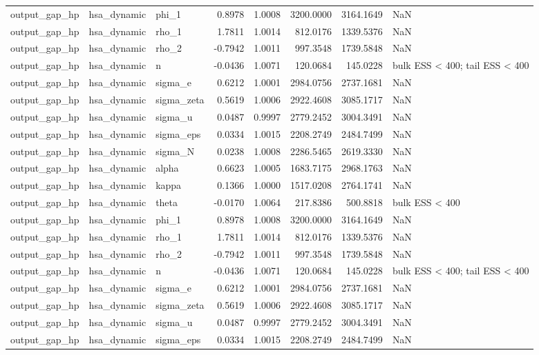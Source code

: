 \begin{tabular}{lllrrrrl}
output\_gap\_hp & hsa\_dynamic & phi\_1 & 0.8978 & 1.0008 & 3200.0000 & 3164.1649 & NaN \\
output\_gap\_hp & hsa\_dynamic & rho\_1 & 1.7811 & 1.0014 & 812.0176 & 1339.5376 & NaN \\
output\_gap\_hp & hsa\_dynamic & rho\_2 & -0.7942 & 1.0011 & 997.3548 & 1739.5848 & NaN \\
output\_gap\_hp & hsa\_dynamic & n & -0.0436 & 1.0071 & 120.0684 & 145.0228 & bulk ESS < 400; tail ESS < 400 \\
output\_gap\_hp & hsa\_dynamic & sigma\_e & 0.6212 & 1.0001 & 2984.0756 & 2737.1681 & NaN \\
output\_gap\_hp & hsa\_dynamic & sigma\_zeta & 0.5619 & 1.0006 & 2922.4608 & 3085.1717 & NaN \\
output\_gap\_hp & hsa\_dynamic & sigma\_u & 0.0487 & 0.9997 & 2779.2452 & 3004.3491 & NaN \\
output\_gap\_hp & hsa\_dynamic & sigma\_eps & 0.0334 & 1.0015 & 2208.2749 & 2484.7499 & NaN \\
output\_gap\_hp & hsa\_dynamic & sigma\_N & 0.0238 & 1.0008 & 2286.5465 & 2619.3330 & NaN \\
output\_gap\_hp & hsa\_dynamic & alpha & 0.6623 & 1.0005 & 1683.7175 & 2968.1763 & NaN \\
output\_gap\_hp & hsa\_dynamic & kappa & 0.1366 & 1.0000 & 1517.0208 & 2764.1741 & NaN \\
output\_gap\_hp & hsa\_dynamic & theta & -0.0170 & 1.0064 & 217.8386 & 500.8818 & bulk ESS < 400 \\
output\_gap\_hp & hsa\_dynamic & phi\_1 & 0.8978 & 1.0008 & 3200.0000 & 3164.1649 & NaN \\
output\_gap\_hp & hsa\_dynamic & rho\_1 & 1.7811 & 1.0014 & 812.0176 & 1339.5376 & NaN \\
output\_gap\_hp & hsa\_dynamic & rho\_2 & -0.7942 & 1.0011 & 997.3548 & 1739.5848 & NaN \\
output\_gap\_hp & hsa\_dynamic & n & -0.0436 & 1.0071 & 120.0684 & 145.0228 & bulk ESS < 400; tail ESS < 400 \\
output\_gap\_hp & hsa\_dynamic & sigma\_e & 0.6212 & 1.0001 & 2984.0756 & 2737.1681 & NaN \\
output\_gap\_hp & hsa\_dynamic & sigma\_zeta & 0.5619 & 1.0006 & 2922.4608 & 3085.1717 & NaN \\
output\_gap\_hp & hsa\_dynamic & sigma\_u & 0.0487 & 0.9997 & 2779.2452 & 3004.3491 & NaN \\
output\_gap\_hp & hsa\_dynamic & sigma\_eps & 0.0334 & 1.0015 & 2208.2749 & 2484.7499 & NaN \\

\end{tabular}
